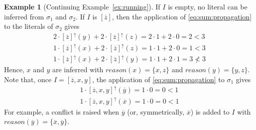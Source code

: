 \documentclass[preprint,authoryear]{elsarticle}
\def\naf{\ensuremath{\raise.17ex\hbox{\ensuremath{\scriptstyle\mathtt{\sim}}}}\xspace}
\theoremstyle{definition}
\newtheorem{example}{Example}[section]
\def\naf{\ensuremath{\raise.17ex\hbox{\ensuremath{\scriptstyle\mathtt{\sim}}}}\xspace}
\begin{document}
\begin{example}[Continuing Example~\ref{ex:running}] \label{ex:sumpropagator}
If $I$ is empty, no literal can be inferred from $\sigma_1$ and $\sigma_2$.
If $I$ is $[\overline{z}]$, then the application of \eqref{eq:sum:propagation} to the literals of $\sigma_2$ gives
\begin{align*}
    2 \cdot [\overline{z}]^\uparrow(y) + 2 \cdot [\overline{z}]^\uparrow(z) = 2 \cdot 1 + 2 \cdot 0 = 2 < 3\\
    1 \cdot [\overline{z}]^\uparrow(x) + 2 \cdot [\overline{z}]^\uparrow(z) = 1\cdot 1 + 2 \cdot 0 = 1 < 3\\
    1 \cdot [\overline{z}]^\uparrow(x) + 2 \cdot [\overline{z}]^\uparrow(y) = 1 \cdot 1 + 2 \cdot 1 = 3 \not< 3
\end{align*}
Hence, $x$ and $y$ are inferred with
$\mathit{reason}(x) = \{x,z\}$ and
$\mathit{reason}(y) = \{y,z\}$.
Note that, once $I = [\overline{z},x,y]$, the application of \eqref{eq:sum:propagation} to $\sigma_1$ gives
\begin{align*}
    1 \cdot [\overline{z},x,y]^\uparrow(\overline{y}) = 1 \cdot 0 = 0 < 1\\
    1 \cdot [\overline{z},x,y]^\uparrow(\overline{x}) = 1 \cdot 0 = 0 < 1
\end{align*}
For example, a conflict is raised when $\overline{y}$ (or, symmetrically, $\overline{x}$) is added to $I$ with $\mathit{reason}(\overline{y}) = \{\overline{x}, \overline{y}\}$.

\end{example}
\end{document}
